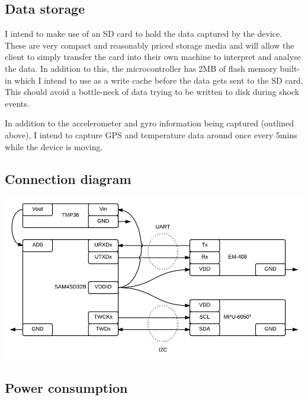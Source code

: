 \documentclass[a4paper, twoside]{article}
\begin{document}
\subsection{Data storage}
I intend to make use of an SD card to hold the data captured by the device.
These are very compact and reasonably priced storage media and will allow the
client to simply transfer the card into their own machine to interpret and
analyse the data. In addition to this, the microcontroller has 2MB of flash
memory built-in which I intend to use as a write cache before the data gets sent
to the SD card. This should avoid a bottle-neck of data trying to be written to
disk during shock events.

In addition to the accelerometer and gyro information being captured (outlined
above), I intend to capture GPS and temperature data around once every 5mins while the device is
moving.

\clearpage
\subsection{Connection diagram}
\begin{center}
\includegraphics[scale=0.45]{images/connectiondiagram.jpeg}
\end{center}

\subsection{Power consumption}
\end{document}
